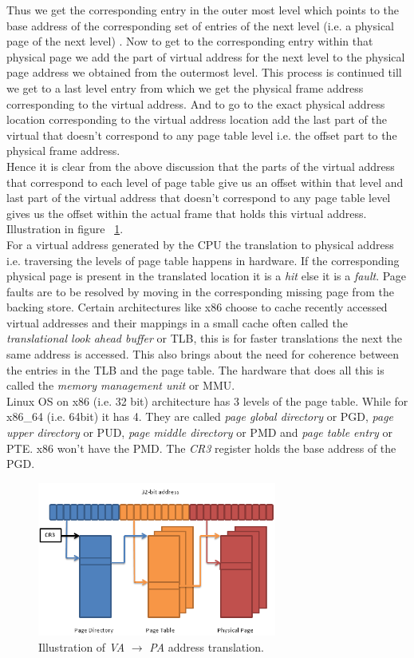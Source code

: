 Thus we get the corresponding entry in the outer most level which points to the base address of
the corresponding set of entries of the next level (i.e. a physical page of the next level) . Now
to get to the corresponding entry within that physical page we add the part of virtual address for
the next level to the physical page address we obtained from the outermost level. This process is
continued till we get to a last level entry from which we get the physical frame address 
corresponding to the virtual address. And to go to the exact physical address location
corresponding to the virtual address location add the last part of the virtual that doesn't
correspond to any page table level i.e. the offset part to the physical frame address.\\    
Hence it is clear from the above discussion that the parts of the virtual address that correspond
to each level of page table give us an offset within that level and last part of the virtual
address that doesn't correspond to any page table level gives us the offset within the actual
frame that holds this virtual address. Illustration in figure ~\ref{fig:fig1}.\\
For a virtual address generated by the CPU the translation to physical address i.e. traversing the
levels of page table happens in hardware. If the corresponding physical page is present in the
translated location it is a \textit{hit} else it is a \textit{fault}. Page faults are to be
resolved by moving in the corresponding missing page from the backing store. Certain architectures
like x86 choose to cache recently accessed virtual addresses and their mappings in a small cache
often called the \textit{translational look ahead buffer} or TLB, this is for faster translations
the next the same address is accessed. This also brings about the need for coherence between the
entries in the TLB and the page table. The hardware that does all this is called the
\textit{memory management unit} or MMU.\\
Linux OS on x86 (i.e. 32 bit) architecture has 3 levels of the page table. While for x86\_64 (i.e.
64bit) it has 4. They are called \textit{page global directory} or PGD, \textit{page upper
directory} or PUD, \textit{page middle directory} or PMD and \textit{page table entry} or PTE. x86
won't have the PMD. The \textit{CR3} register holds the base address of the PGD.\\
\begin{figure}[tbp]
  \begin{center}
    \includegraphics[width=0.7\textwidth]{pagetable}
    \caption[Page Table Illustration]{Illustration of \textit{VA} $\rightarrow$ \textit{PA} address translation.}
    \label{fig:fig1}
  \end{center}
\end{figure}


